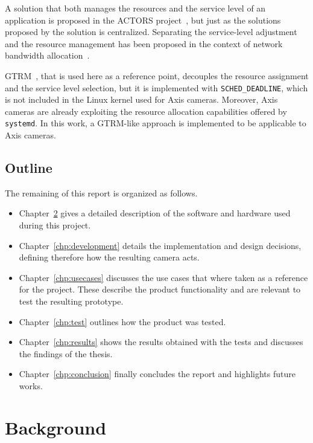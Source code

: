 \documentclass[nobiblatex]{LTHthesis}
\begin{document}
A solution that both manages the resources and the service level of an 
application is proposed in the ACTORS project~\cite{Bin11}, but just as the 
solutions proposed by \cite{Raj97a,Soj11,Arz11} the solution is centralized. 
Separating the service-level adjustment and the resource management has been proposed in the context of network bandwidth allocation~\cite{Sil11}.

GTRM~\cite{gtrm}, that is used here as a reference point, decouples the
resource assignment and the service level selection, but it is implemented
with \texttt{SCHED\_DEADLINE}, which is not included in the Linux kernel
used for Axis cameras. Moreover, Axis cameras are already exploiting the
resource allocation capabilities offered by \texttt{systemd}. In this
work, a GTRM-like approach is implemented to be applicable to Axis cameras.

\section{Outline}

The remaining of this report is organized as follows.

\begin{itemize}
\item Chapter~\ref{chp:background} gives a detailed description of
  the software and hardware used during this project.
\item Chapter~\ref{chp:development} details the implementation and design
  decisions, defining therefore how the resulting camera acts.
\item Chapter~\ref{chp:usecases} discusses the use cases that where
  taken as a reference for the project. These describe the product
  functionality and are relevant to test the resulting prototype.
\item Chapter~\ref{chp:test} outlines how the product was tested.
\item Chapter~\ref{chp:results} shows the results obtained with the
  tests and discusses the findings of the thesis.
\item Chapter~\ref{chp:conclusion} finally concludes the report and
  highlights future works.
\end{itemize}



\chapter{Background}
\label{chp:background}
\end{document}

